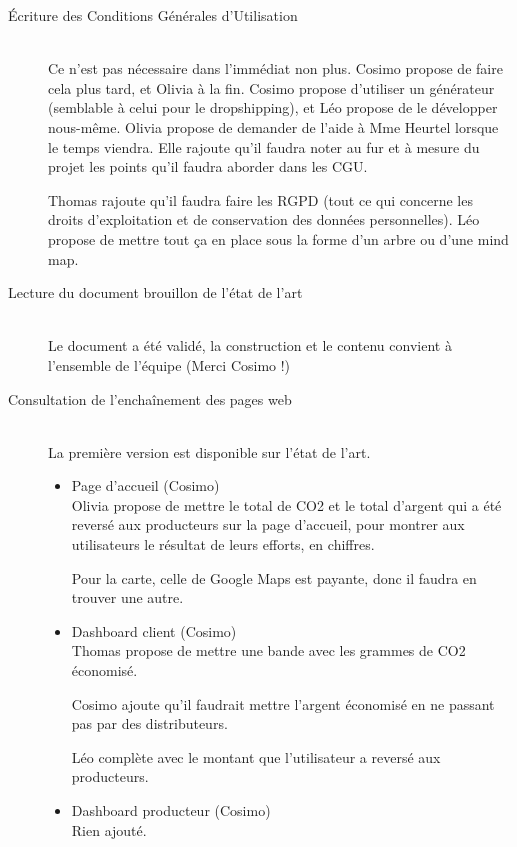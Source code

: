 \begin{description}
        \item[Écriture des Conditions Générales d’Utilisation] \hfill\\
            	Ce n’est pas nécessaire dans l'immédiat non plus. Cosimo propose de faire cela plus tard, et Olivia à la fin. Cosimo propose d’utiliser un générateur (semblable à celui pour le dropshipping), et Léo propose de le développer nous-même. Olivia propose de demander de l’aide à Mme Heurtel lorsque le temps viendra. Elle rajoute qu’il faudra noter au fur et à mesure du projet les points qu’il faudra aborder dans les CGU.
                \par
                Thomas rajoute qu’il faudra faire les RGPD (tout ce qui concerne les droits d’exploitation et de conservation des données personnelles).
                Léo propose de mettre tout ça en place sous la forme d’un arbre ou d’une mind map.

        \vskip 0.5cm
                
        \item[Lecture du document brouillon de l’état de l’art] \hfill\\
                Le document a été validé, la construction et le contenu convient à l’ensemble de l’équipe (Merci Cosimo !)

        \vskip 0.5cm

        \item[Consultation de l’enchaînement des pages web] \hfill\\
            La première version est disponible sur l’état de l’art.

            \begin{itemize}[label=\textbullet]
                \item Page d’accueil (Cosimo)\\
                    Olivia propose de mettre le total de CO2 et le total d’argent qui a été reversé aux producteurs sur la page d’accueil, pour montrer aux utilisateurs le résultat de leurs efforts, en chiffres.
                    \par
                    Pour la carte, celle de Google Maps est payante, donc il faudra en trouver une autre.
                \item Dashboard client (Cosimo)\\
                    Thomas propose de mettre une bande avec les grammes de CO2 économisé.
                    \par
                    Cosimo ajoute qu’il faudrait mettre l’argent économisé en ne passant pas par des distributeurs.
                    \par
                    Léo complète avec le montant que l’utilisateur a reversé aux producteurs.
                \item Dashboard producteur (Cosimo)\\
                    Rien ajouté.
                

\end{itemize}
\end{description}
